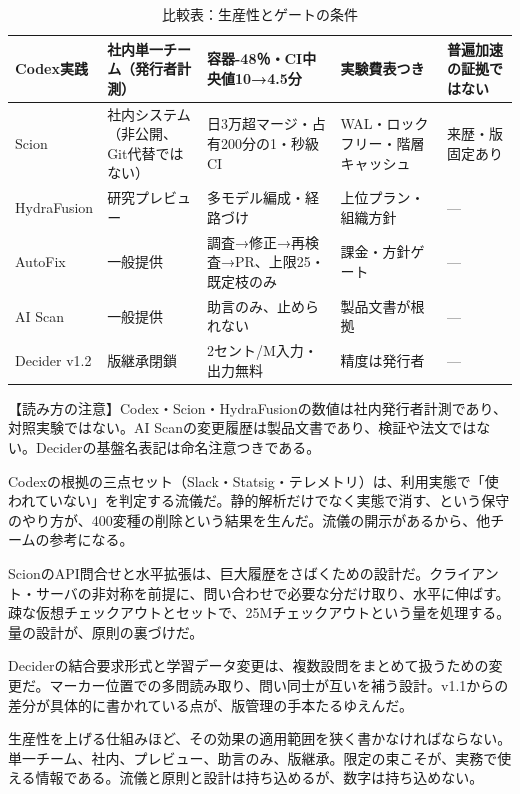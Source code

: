 \documentclass[lualatex,a4paper,10pt]{jlreq}
\begin{document}
\begin{table}[htbp]\centering\footnotesize
\caption{比較表：生産性とゲートの条件}
\begin{tabularx}{0.96\linewidth}{@{}lXXXX@{}}
\toprule
Codex実践 & 社内単一チーム（発行者計測） & 容器-48％・CI中央値10→4.5分 & 実験費表つき & 普遍加速の証拠ではない \\
\midrule
Scion & 社内システム（非公開、Git代替ではない） & 日3万超マージ・占有200分の1・秒級CI & WAL・ロックフリー・階層キャッシュ & 来歴・版固定あり \\
\midrule
HydraFusion & 研究プレビュー & 多モデル編成・経路づけ & 上位プラン・組織方針 & --- \\
\midrule
AutoFix & 一般提供 & 調査→修正→再検査→PR、上限25・既定枝のみ & 課金・方針ゲート & --- \\
\midrule
AI Scan & 一般提供 & 助言のみ、止められない & 製品文書が根拠 & --- \\
\midrule
Decider v1.2 & 版継承閉鎖 & 2セント/M入力・出力無料 & 精度は発行者 & --- \\
\bottomrule
\end{tabularx}
\end{table}
\cite{B31,B36,B33,B34,B35,B37,B38,B32}


\begin{tcolorbox}[colback=SurveySoft,colframe=SurveyRule,arc=1mm,boxrule=0.4pt,left=2mm,right=2mm]
【読み方の注意】Codex・Scion・HydraFusionの数値は社内発行者計測であり、対照実験ではない。AI Scanの変更履歴は製品文書であり、検証や法文ではない。Deciderの基盤名表記は命名注意つきである。
\end{tcolorbox}
\cite{B31,B36,B33,B34,B35,B37,B38,B32}


Codexの根拠の三点セット（Slack・Statsig・テレメトリ）は、利用実態で「使われていない」を判定する流儀だ。静的解析だけでなく実態で消す、という保守のやり方が、400変種の削除という結果を生んだ。流儀の開示があるから、他チームの参考になる。
\cite{B31}


ScionのAPI問合せと水平拡張は、巨大履歴をさばくための設計だ。クライアント・サーバの非対称を前提に、問い合わせで必要な分だけ取り、水平に伸ばす。疎な仮想チェックアウトとセットで、25Mチェックアウトという量を処理する。量の設計が、原則の裏づけだ。
\cite{B32}


Deciderの結合要求形式と学習データ変更は、複数設問をまとめて扱うための変更だ。マーカー位置での多問読み取り、問い同士が互いを補う設計。v1.1からの差分が具体的に書かれている点が、版管理の手本たるゆえんだ。
\cite{B36,B37,B38}


生産性を上げる仕組みほど、その効果の適用範囲を狭く書かなければならない。単一チーム、社内、プレビュー、助言のみ、版継承。限定の束こそが、実務で使える情報である。流儀と原則と設計は持ち込めるが、数字は持ち込めない。
\cite{B31,B36,B33,B34,B35,B37,B38,B32}
\end{document}
